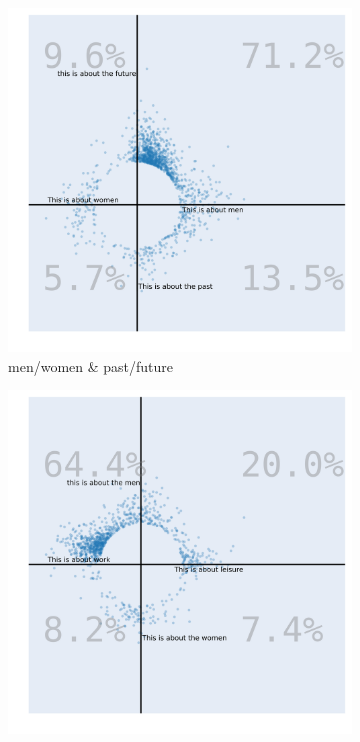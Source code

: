 \documentclass{article}
\begin{document}
\begin{figure}[ht]
 \medskip %
 \begin{subfigure}{0.49\textwidth}
     \centering
     \includegraphics[width=\linewidth]{img/bourdieu/fp_mw.png}
     \caption{men/women \& past/future}
     \label{fig:c}
 \end{subfigure}
 \hfill
 \begin{subfigure}{0.49\textwidth}
     \centering
     \includegraphics[width=\linewidth]{img/bourdieu/lw_mw.png}

\end{subfigure}
\end{figure}
\end{document}
